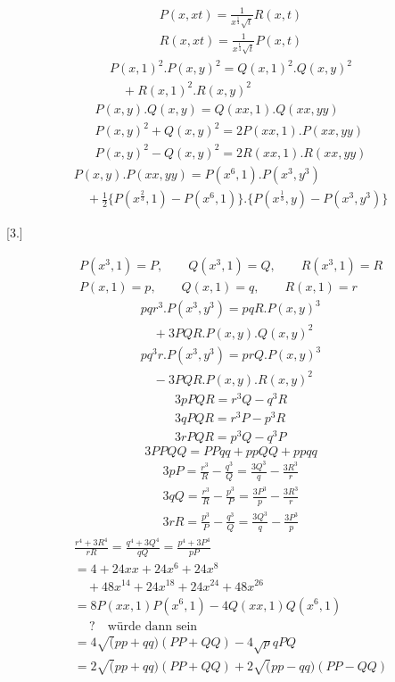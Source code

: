 

\[
\begin{gathered}
P(x,xt)=\frac{1}{x^{\frac14}\surd t}R(x,t)\\[8pt]
R(x,xt)=\frac{1}{x^{\frac14}\surd t}P(x,t)
\end{gathered}
\]
\[
\begin{gathered}P(x,1)^2.P(x,y)^2=Q(x,1)^2.Q(x,y)^2\\[8pt]\quad{}+R(x,1)^2.R(x,y)^2\end{gathered}
\]
\[
\begin{gathered}
P(x,y).Q(x,y)=Q(xx,1).Q(xx,yy)\\[8pt]
P(x,y)^2+Q(x,y)^2=2P(xx,1).P(xx,yy)\\[8pt]
P(x,y)^2-Q(x,y)^2=2R(xx,1).R(xx,yy)
\end{gathered}
\]
\[
\begin{gathered}P(x,y).P(xx,yy)=P(x^6,1).P(x^3,y^3)
\\[8pt]\quad{}+\tfrac12\{P(x^{\frac23},1)-P(x^6,1)\}.
\{P(x^{\frac13},y)-P(x^3,y^3)\}\end{gathered}
\]

\par\medskip{}\centerline{[3.]}\nobreak\smallskip
\[
\begin{gathered}
P(x^3,1)=P,\qquad Q(x^3,1)=Q,\qquad R(x^3,1)=R\\[8pt]
P(x,1)=p,\qquad Q(x,1)=q,\qquad R(x,1)=r
\end{gathered}
\]
\[
\begin{gathered}
pqr^3.P(x^3,y^3)=pqR.P(x,y)^3\\[8pt]\quad{}+3PQR.P(x,y).Q(x,y)^2\\[8pt]
pq^3r.P(x^3,y^3)=prQ.P(x,y)^3\\[8pt]\quad{}-3PQR.P(x,y).R(x,y)^2
\end{gathered}
\]
\[
\begin{gathered}
3pPQR=r^3Q-q^3R\\[8pt]
3qPQR=r^3P-p^3R\\[8pt]
3rPQR=p^3Q-q^3P
\end{gathered}
\]
\[
3PPQQ=PPqq+ppQQ+ppqq
\]
\[
\begin{gathered}
3pP=\frac{r^3}{R}-\frac{q^3}{Q}=\frac{3Q^3}{q}-\frac{3R^3}{r}\\[8pt]
3qQ=\frac{r^3}{R}-\frac{p^3}{P}=\frac{3P^3}{p}-\frac{3R^3}{r}\\[8pt]
3rR=\frac{p^3}{P}-\frac{q^3}{Q}=\frac{3Q^3}{q}-\frac{3P^3}{p}
\end{gathered}
\]
\[
\begin{gathered}
\frac{r^4+3R^4}{rR}=\frac{q^4+3Q^4}{qQ}=\frac{p^4+3P^4}{pP}\\[8pt]
=4+24xx+24x^6+24x^8\\[8pt]\quad{}+48x^{14}+24x^{18}+24x^{24}+48x^{26}\\[8pt]
=8P(xx,1)P(x^6,1)-4Q(xx,1)Q(x^6,1)\\[8pt]\quad{}\ ?\quad\text{würde dann sein}\\[8pt]
=4\surd(pp+qq)(PP+QQ)-4\surd pqPQ\\[8pt]
=2\surd(pp+qq)(PP+QQ)+2\surd(pp-qq)(PP-QQ)
\end{gathered}
\]


